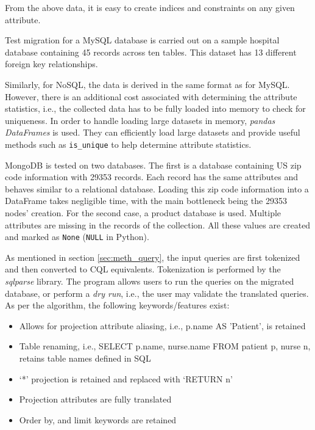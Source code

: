 \documentclass[12pt]{article}
\begin{document}
    From the above data, it is easy to create indices and constraints on any given attribute.

    Test migration for a MySQL database is carried out on a sample hospital database containing 45 records across ten tables. This dataset has 13 different foreign key relationships.

    Similarly, for NoSQL, the data is derived in the same format as for MySQL. However, there is an additional cost associated with determining the attribute statistics, i.e., the collected data has to be fully loaded into memory to check for uniqueness. In order to handle loading large datasets in memory, \textit{pandas DataFrames} is used. They can efficiently load large datasets and provide useful methods such as \verb|is_unique| to help determine attribute statistics.

    MongoDB is tested on two databases. The first is a database containing US zip code information with 29353 records. Each record has the same attributes and behaves similar to a relational database. Loading this zip code information into a DataFrame takes negligible time, with the main bottleneck being the 29353 nodes' creation. For the second case, a product database is used. Multiple attributes are missing in the records of the collection. All these values are created and marked as \verb|None| (\verb|NULL| in Python).

    As mentioned in section \ref{sec:meth_query}, the input queries are first tokenized and then converted to CQL equivalents. Tokenization is performed by the \textit{sqlparse} library. The program allows users to run the queries on the migrated database, or perform a \textit{dry run}, i.e., the user may validate the translated queries. As per the algorithm, the following keywords/features exist:
    \begin{itemize}
        \item Allows for projection attribute aliasing, i.e., p.name AS 'Patient', is retained
        \item Table renaming, i.e., SELECT p.name, nurse.name FROM patient p, nurse n, retains table names defined in SQL
        \item `*' projection is retained and replaced with `RETURN n'
        \item Projection attributes are fully translated
        \item Order by, and limit keywords are retained
    \end{itemize}
\end{document}
